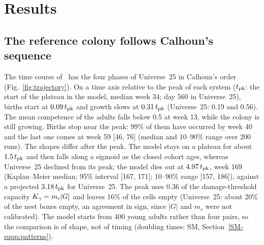 \section{Results}
\label{sec:results}

\subsection{The reference colony follows Calhoun's sequence}
\label{sec:res-trajectory}

The time course of \Cone\ has the four phases of Universe~25 in Calhoun's order (Fig.~\ref{fig:trajectory}). On a
time axis relative to the peak of each system ($t_{\rm pk}$: the start of the plateau in the model, median week 34;
day 560 in Universe~25), births start at $0.09\,t_{\rm pk}$ and growth slows at $0.31\,t_{\rm pk}$ (Universe~25: 0.19
and 0.56). The mean competence of the adults falls below 0.5 at week 13, while the colony is still growing. Births
stop near the peak: 99\% of them have occurred by week 40 and the last one comes at week 59 [46, 76] (median and
10--90\% range over 200 runs). The shapes differ after the peak. The model stays on a plateau for about
$1.5\,t_{\rm pk}$ and then falls along a sigmoid as the closed cohort ages, whereas Universe~25 declined from its
peak; the model dies out at $4.97\,t_{\rm pk}$, week 169 (Kaplan--Meier median; 95\% interval [167, 171]; 10--90\%
range [157, 186]), against a projected $3.18\,t_{\rm pk}$ for Universe~25. The peak uses $0.36$ of the
damage-threshold capacity $K_\gamma=m_c|G|$ and leaves 16\% of the cells empty (Universe~25: about 20\% of the nest boxes
empty, an agreement in sign, since $|G|$ and $m_c$ were not calibrated). The model starts from 400 young adults
rather than four pairs, so the comparison is of shape, not of timing (doubling times: SM,
Section~\ref{SM-supp:patterns}).

